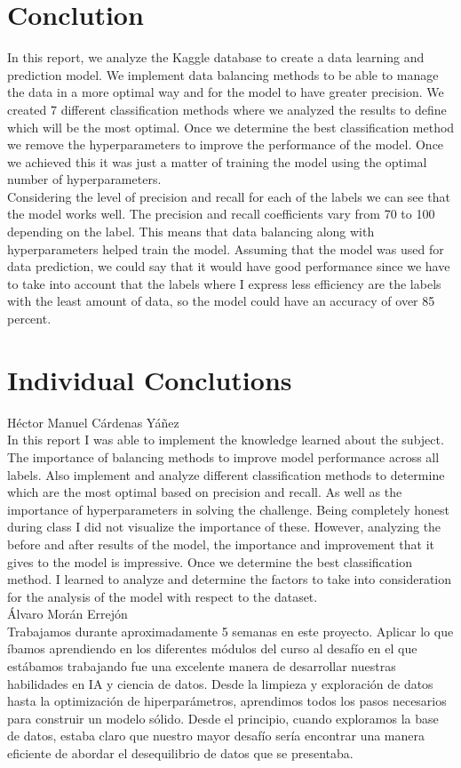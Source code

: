 \documentclass{article}
\begin{document}
\section{Conclution}
In this report, we analyze the Kaggle database to create a data learning and prediction model.
 We implement data balancing methods to be able to manage the data in a more optimal way and for 
 the model to have greater precision. We created 7 different classification methods where we analyzed 
 the results to define which will be the most optimal. Once we determine the best classification method 
 we remove the hyperparameters to improve the performance of the model. Once we achieved this it was just
  a matter of training the model using the optimal number of hyperparameters.\\

Considering the level of precision and recall for each of the labels we can see that the model works well. 
The precision and recall coefficients vary from 70 to 100 depending on the label. This means that data balancing
 along with hyperparameters helped train the model. Assuming that the model was used for data prediction, 
 we could say that it would have good performance since we have to take into account that the labels where I express
  less efficiency are the labels with the least amount of data, so the model could have an accuracy of over 85 percent.

\section{Individual Conclutions}
Héctor Manuel Cárdenas Yáñez\\
In this report I was able to implement the knowledge learned about the subject. The importance of balancing methods 
to improve model performance across all labels. Also implement and analyze different classification methods to determine 
which are the most optimal based on precision and recall. As well as the importance of hyperparameters in solving the challenge. 
Being completely honest during class I did not visualize the importance of these. However, analyzing the before and after results
 of the model, the importance and improvement that it gives to the model is impressive. Once we determine the best classification method.
  I learned to analyze and determine the factors to take into consideration for the analysis of the model with respect to the dataset.\\

Álvaro Morán Errejón\\
Trabajamos durante aproximadamente 5 semanas en este proyecto. Aplicar lo que íbamos aprendiendo en los diferentes
módulos del curso al desafío en el que estábamos trabajando fue una excelente manera de desarrollar nuestras habilidades en
 IA y ciencia de datos. Desde la limpieza y exploración de datos hasta la optimización de hiperparámetros, aprendimos todos 
 los pasos necesarios para construir un modelo sólido. Desde el principio, cuando exploramos la base de datos, estaba claro que
  nuestro mayor desafío sería encontrar una manera eficiente de abordar el desequilibrio de datos que se presentaba. \\
\end{document}
